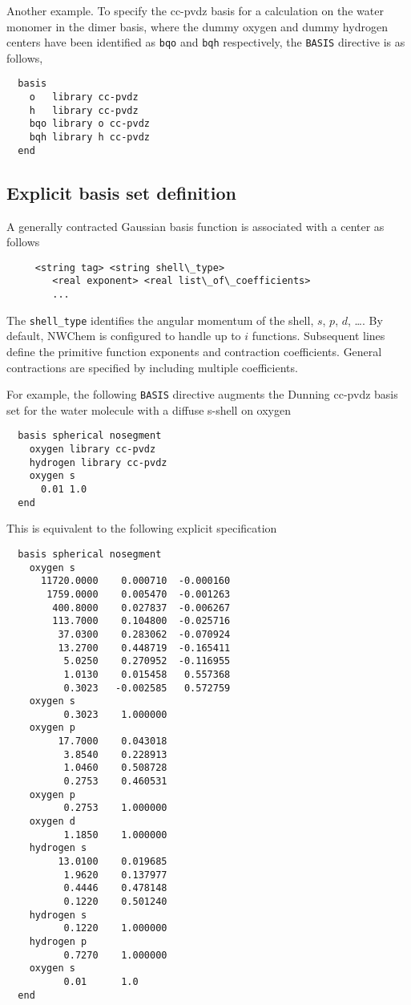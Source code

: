 Another example.  To specify the cc-pvdz basis for a calculation on
the water monomer in the dimer basis, where the dummy oxygen and dummy
hydrogen centers have been identified as \verb+bqo+ and \verb+bqh+
respectively, the \verb+BASIS+ directive is as follows,

\begin{verbatim}
  basis
    o   library cc-pvdz
    h   library cc-pvdz
    bqo library o cc-pvdz
    bqh library h cc-pvdz
  end
\end{verbatim}

\subsection{Explicit basis set definition}

A generally contracted Gaussian basis function is associated with a
center as follows
\begin{verbatim}
     <string tag> <string shell\_type>
        <real exponent> <real list\_of\_coefficients>
        ...
\end{verbatim}

The \verb+shell_type+ identifies the angular momentum of the shell,
$s$, $p$, $d$, \ldots.  By default, NWChem is configured to handle up
to $i$ functions.  Subsequent lines define the primitive function
exponents and contraction coefficients.  General contractions are
specified by including multiple coefficients.

For example, the following \verb+BASIS+ directive augments the Dunning
cc-pvdz basis set for the water molecule with a diffuse s-shell on
oxygen
\begin{verbatim}
  basis spherical nosegment
    oxygen library cc-pvdz
    hydrogen library cc-pvdz
    oxygen s
      0.01 1.0
  end
\end{verbatim}

This is equivalent to the following explicit specification
\begin{verbatim}
  basis spherical nosegment
    oxygen s
      11720.0000    0.000710  -0.000160
       1759.0000    0.005470  -0.001263
        400.8000    0.027837  -0.006267
        113.7000    0.104800  -0.025716
         37.0300    0.283062  -0.070924
         13.2700    0.448719  -0.165411
          5.0250    0.270952  -0.116955
          1.0130    0.015458   0.557368
          0.3023   -0.002585   0.572759
    oxygen s                
          0.3023    1.000000
    oxygen p                
         17.7000    0.043018
          3.8540    0.228913
          1.0460    0.508728
          0.2753    0.460531
    oxygen p                
          0.2753    1.000000
    oxygen d
          1.1850    1.000000
    hydrogen s
         13.0100    0.019685
          1.9620    0.137977
          0.4446    0.478148
          0.1220    0.501240
    hydrogen s  
          0.1220    1.000000
    hydrogen p  
          0.7270    1.000000
    oxygen s
          0.01      1.0
  end
\end{verbatim}




